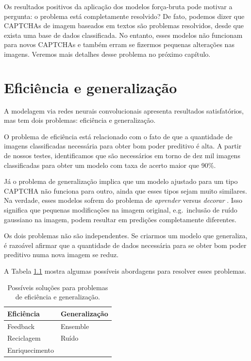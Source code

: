 \documentclass[12pt,]{report}
\begin{document}
Os resultados positivos da aplicação dos modelos força-bruta pode motivar a pergunta: o problema está completamente resolvido? De fato, podemos dizer que CAPTCHAs de imagem baseados em textos são problemas resolvidos, desde que exista uma base de dados classificada. No entanto, esses modelos não funcionam para novos CAPTCHAs e também erram se fizermos pequenas alterações nas imagens. Veremos mais detalhes desse problema no próximo capítulo.

\hypertarget{eficiuxeancia-e-generalizauxe7uxe3o}{%
\chapter{Eficiência e generalização}\label{eficiuxeancia-e-generalizauxe7uxe3o}}

A modelagem via redes neurais convolucionais apresenta resultados satisfatórios, mas tem dois problemas: eficiência e generalização.

O problema de eficiência está relacionado com o fato de que a quantidade de imagens classificadas necessária para obter bom poder preditivo é alta. A partir de nossos testes, identificamos que são necessários em torno de dez mil imagens classificadas para obter um modelo com taxa de acerto maior que 90\%.

Já o problema de generalização implica que um modelo ajustado para um tipo CAPTCHA não funciona para outro, ainda que esses tipos sejam muito similares. Na verdade, esses modelos sofrem do problema de \emph{aprender} versus \emph{decorar} \citep{zhang2016understanding}. Isso significa que pequenas modificações na imagem original, e.g.~inclusão de ruído gaussiano na imagem, podem resultar em predições completamente diferentes.

Os dois problemas não são independentes. Se criarmos um modelo que generaliza, é razoável afirmar que a quantidade de dados necessária para se obter bom poder preditivo numa nova imagem se reduz.

A Tabela \ref{tab:solucoes} mostra algumas possíveis abordagens para resolver esses problemas.

\begin{table}

\caption{\label{tab:solucoes}Possíveis soluções para problemas de eficiência e generalização.}
\centering
\begin{tabular}[t]{l|l}
\hline
Eficiência & Generalização\\
\hline
Feedback & Ensemble\\
\hline
Reciclagem & Ruído\\
\hline
Enriquecimento & \\
\hline
\end{tabular}
\end{table}
\end{document}
